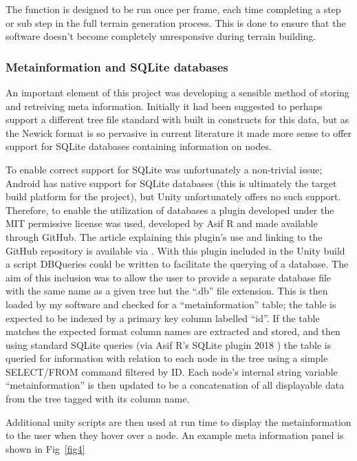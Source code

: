 \documentclass[10pt,letterpaper]{article}
\begin{document}
The function is designed to be run once per frame, each time completing a step or sub step in the full terrain generation process. This is done to ensure that the software doesn’t become completely unresponsive during terrain building.

\subsubsection {Metainformation and SQLite databases}

An important element of this project was developing a sensible method of storing and retreiving meta information. Initially it had been suggested to perhaps support a different tree file standard with built in constructs for this data, but as the Newick format is so pervasive in current literature it made more sense to offer support for SQLite databases containing information on nodes.
 
To enable correct support for SQLite was unfortunately a non-trivial issue; Android has native support for SQLite databases (this is ultimately the target build platform for the project), but Unity unfortunately offers no such support. Therefore, to enable the utilization of databases a plugin developed under the MIT permissive license was used, developed by Asif R and made available through GitHub. The article explaining this plugin’s use and linking to the GitHub repository is available via \cite{bib6}. With this plugin included in the Unity build a script DBQueries could be written to facilitate the querying of a database. 
The aim of this inclusion was to allow the user to provide a separate database file with the same name as a given tree but the “.db” file extension. This is then loaded by my software and checked for a “metainformation” table; the table is expected to be indexed by a primary key column labelled “id”. If the table matches the expected format column names are extracted and stored, and then using standard SQLite queries (via Asif R’s SQLite plugin 2018 \cite{bib6}) the table is queried for information with relation to each node in the tree using a simple SELECT/FROM command filtered by ID. Each node’s internal string variable “metainformation” is then updated to be a concatenation of all displayable data from the tree tagged with its column name. 

Additional unity scripts are then used at run time to display the metainformation to the user when they hover over a node. An example meta information panel is shown in Fig~\ref{fig4}
\end{document}
